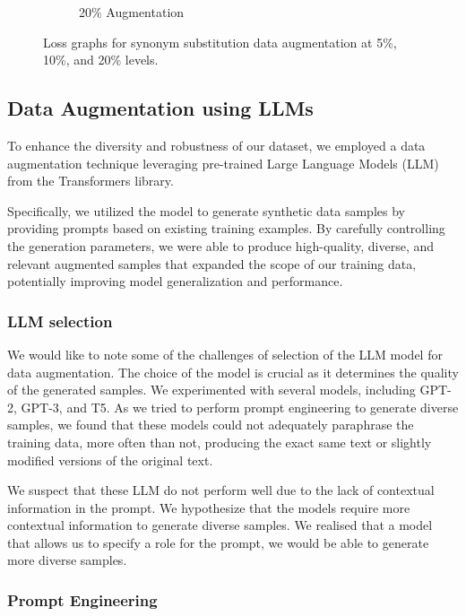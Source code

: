 \documentclass{article}
\begin{document}
\begin{figure}[ht]
\begin{subfigure}[b]{0.3\textwidth}
    \caption{20\% Augmentation}
    \label{fig:synonym_loss_20}
  \end{subfigure}
  \caption{Loss graphs for synonym substitution data augmentation at 5\%, 10\%, and 20\% levels.}
  \label{fig:synonym_substitution_loss}
\end{figure}

\subsection{Data Augmentation using LLMs}

To enhance the diversity and robustness of our dataset, we employed a data
augmentation technique leveraging pre-trained Large Language Models (LLM) from
the Transformers library.

Specifically, we utilized the model to generate synthetic data samples by
providing prompts based on existing training examples. By carefully controlling
the generation parameters, we were able to produce high-quality, diverse, and
relevant augmented samples that expanded the scope of our training data,
potentially improving model generalization and performance.

\subsubsection{LLM selection}

We would like to note some of the challenges of selection of the LLM model for
data augmentation. The choice of the model is crucial as it determines the
quality of the generated samples. We experimented with several models,
including GPT-2, GPT-3, and T5. As we tried to perform prompt engineering to
generate diverse samples, we found that these models could not adequately
paraphrase the training data, more often than not, producing the exact same
text or slightly modified versions of the original text.

We suspect that these LLM do not perform well due to the lack of contextual
information in the prompt. We hypothesize that the models require more
contextual information to generate diverse samples. We realised that a model
that allows us to specify a role for the prompt, we would be able to generate
more diverse samples.

\subsubsection{Prompt Engineering}
\end{document}
